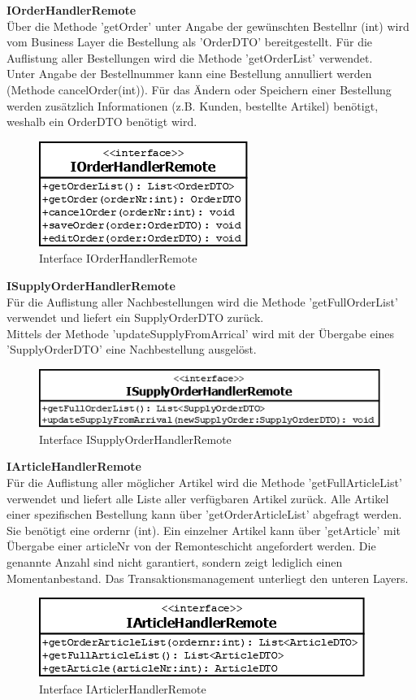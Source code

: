 \textbf{IOrderHandlerRemote}\\
Über die Methode 'getOrder' unter Angabe der gewünschten Bestellnr (int) wird vom Business Layer die Bestellung als 'OrderDTO' bereitgestellt. Für die Auflistung aller Bestellungen wird die Methode 'getOrderList' verwendet.\\
Unter Angabe der Bestellnummer kann eine Bestellung annulliert werden (Methode cancelOrder(int)). Für das Ändern oder Speichern einer Bestellung werden zusätzlich Informationen (z.B. Kunden, bestellte Artikel) benötigt, weshalb ein OrderDTO benötigt wird.


\begin{figure}[H]
	\includegraphics[width=0.3\linewidth]{Images/IOrderHandlerRemote}
	\caption{Interface IOrderHandlerRemote}
	\label{fig:if-IOrderHandlerRemote}
\end{figure}

\textbf{ISupplyOrderHandlerRemote}\\
Für die Auflistung aller Nachbestellungen wird die Methode 'getFullOrderList' verwendet und liefert ein SupplyOrderDTO zurück.\\
Mittels der Methode 'updateSupplyFromArrical' wird mit der Übergabe eines 'SupplyOrderDTO' eine Nachbestellung ausgelöst. 
\begin{figure}[H]
	\includegraphics[width=0.6\linewidth]{Images/ISupplyOrderHandlerRemote}
	\caption{Interface ISupplyOrderHandlerRemote}
	\label{fig:if-ISupplyOrderHandlerRemote}
\end{figure}


\textbf{IArticleHandlerRemote}\\
Für die Auflistung aller möglicher Artikel wird die Methode 'getFullArticleList' verwendet und liefert alle Liste aller verfügbaren Artikel zurück. Alle Artikel einer spezifischen Bestellung kann über 'getOrderArticleList' abgefragt werden. Sie benötigt eine ordernr (int). Ein einzelner Artikel kann über 'getArticle' mit Übergabe einer articleNr von der Remonteschicht angefordert werden. Die genannte Anzahl sind nicht garantiert, sondern zeigt lediglich einen Momentanbestand. Das Transaktionsmanagement unterliegt den unteren Layers.
\begin{figure}[H]
	\includegraphics[width=0.6\linewidth]{Images/IArticleHandlerRemote}
	\caption{Interface IArticlerHandlerRemote}
	\label{fig:if-IArticleHandlerRemote}
\end{figure}

